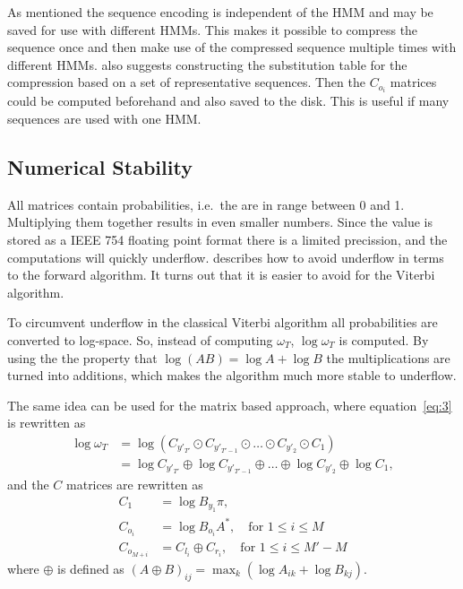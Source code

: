 As mentioned the sequence encoding is independent of the HMM and may be saved
for use with different HMMs. This makes it possible to compress the sequence
once and then make use of the compressed sequence multiple times with different
HMMs. \citet{lifshits2009speeding} also suggests constructing the substitution
table for the compression based on a set of representative sequences. Then the
$C_{o_i}$ matrices could be computed beforehand and also saved to the
disk. This is useful if many sequences are used with one HMM.\

\subsection{Numerical Stability}

All matrices contain probabilities, i.e.\ the are in range between 0 and
1. Multiplying them together results in even smaller numbers. Since the value
is stored as a IEEE 754 floating point format there is a limited precission,
and the computations will quickly underflow. \citet{sand2013ziphmmlib}
describes how to avoid underflow in terms to the forward algorithm. It turns
out that it is easier to avoid for the Viterbi algorithm.

To circumvent underflow in the classical Viterbi algorithm all probabilities
are converted to log-space. So, instead of computing $\omega_T$,
$\log \omega_T$ is computed. By using the the property that
$\log(AB) = \log A + \log B$ the multiplications are turned into additions,
which makes the algorithm much more stable to underflow.

The same idea can be used for the matrix based approach, where
equation~\eqref{eq:3} is rewritten as
\begin{align*}
  \log \omega_T &= \log \left(C_{y'_{T'}} \odot C_{y'_{T'-1}} \odot \dots \odot
                  C_{y'_2} \odot C_1 \right) \\
                &= \log C_{y'_{T'}} \oplus \log C_{y'_{T'-1}} \oplus \dots \oplus
                  \log C_{y'_2} \oplus \log C_1,
\end{align*}
and the $C$ matrices are rewritten as
\begin{align*}
  C_1 &= \log B_{y_1} \pi, \\
  C_{o_i} &= \log B_{o_i} A^*, \quad \text{for }1 \le i \le M\\
  C_{o_{M + i}} &= C_{l_i} \oplus C_{r_i} , \quad \text{for }1 \le i \le M' - M
\end{align*}
where $\oplus$ is defined as
${ \left( A \oplus B \right)}_{ij} = \max_k \left( \log A_{ik} + \log B_{kj}
\right)$.


